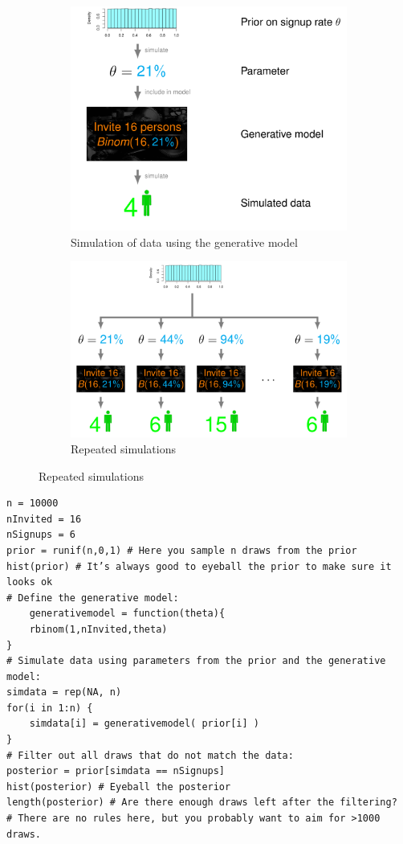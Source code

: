 \documentclass[11pt]{article}
\begin{document}
\begin{figure}[htb]
	\begin{subfigure}{.5\textwidth}
		\centering
		\includegraphics[width=0.7\linewidth, keepaspectratio]{img/bayesian_approach_simulation}
		\caption{Simulation of data using the generative model}
		\label{fig:bayesianapproachsimulation}
	\end{subfigure}
	\begin{subfigure}{.5\textwidth}
		\centering
		\includegraphics[width=0.9\linewidth, keepaspectratio]{img/bayesian_approach_repeated_simulation}
		\caption{Repeated simulations}
		\label{fig:bayesianapproachrepeatedsimulation}
	\end{subfigure}
\end{figure}

\begin{verbatim}
n = 10000
nInvited = 16
nSignups = 6
prior = runif(n,0,1) # Here you sample n draws from the prior
hist(prior) # It’s always good to eyeball the prior to make sure it looks ok
# Define the generative model:
	generativemodel = function(theta){
	rbinom(1,nInvited,theta)
}
# Simulate data using parameters from the prior and the generative model:
simdata = rep(NA, n)
for(i in 1:n) {
	simdata[i] = generativemodel( prior[i] )
}
# Filter out all draws that do not match the data:
posterior = prior[simdata == nSignups]
hist(posterior) # Eyeball the posterior
length(posterior) # Are there enough draws left after the filtering?
# There are no rules here, but you probably want to aim for >1000 draws.
\end{verbatim}
\end{document}
